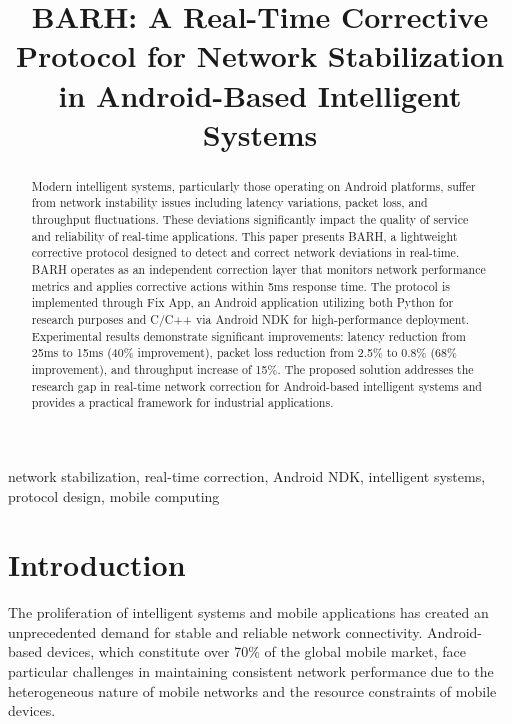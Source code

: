 \documentclass[conference]{IEEEtran}
\begin{document}
\title{BARH: A Real-Time Corrective Protocol for Network Stabilization in Android-Based Intelligent Systems}

\author{
}

\maketitle

\begin{abstract}
Modern intelligent systems, particularly those operating on Android platforms, suffer from network instability issues including latency variations, packet loss, and throughput fluctuations. These deviations significantly impact the quality of service and reliability of real-time applications. This paper presents BARH, a lightweight corrective protocol designed to detect and correct network deviations in real-time. BARH operates as an independent correction layer that monitors network performance metrics and applies corrective actions within 5ms response time. The protocol is implemented through Fix App, an Android application utilizing both Python for research purposes and C/C++ via Android NDK for high-performance deployment. Experimental results demonstrate significant improvements: latency reduction from 25ms to 15ms (40\% improvement), packet loss reduction from 2.5\% to 0.8\% (68\% improvement), and throughput increase of 15\%. The proposed solution addresses the research gap in real-time network correction for Android-based intelligent systems and provides a practical framework for industrial applications.
\end{abstract}

\begin{IEEEkeywords}
network stabilization, real-time correction, Android NDK, intelligent systems, protocol design, mobile computing
\end{IEEEkeywords}

\section{Introduction}

The proliferation of intelligent systems and mobile applications has created an unprecedented demand for stable and reliable network connectivity. Android-based devices, which constitute over 70\% of the global mobile market, face particular challenges in maintaining consistent network performance due to the heterogeneous nature of mobile networks and the resource constraints of mobile devices.
\end{document}
